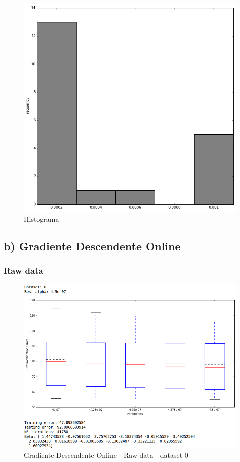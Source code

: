 \documentclass[spanish, fleqn]{article}
\begin{document}
\begin{enumerate}
\begin{figure}[!htpb]
\centering
 \includegraphics[scale=0.4]{hist_gd_batch_norm.png}
 \caption{Histograma}
\end{figure}






\subsection*{b) Gradiente Descendente Online}

\subsubsection*{Raw data}
\begin{figure}[!htpb]
\centering
 \includegraphics[scale=0.45]{gd_online_raw0.png}
 \caption{Gradiente Descendente Online - Raw data - dataset 0}
\end{figure}


\end{enumerate}
\end{document}
